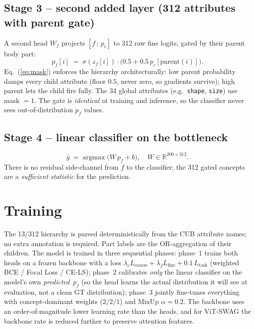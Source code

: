 \documentclass[10pt,conference,twocolumn,a4paper]{article}
\begin{document}
\subsection{Stage 3 -- second added layer (312 attributes with parent gate)}
A second head $W_f$ projects $[f \,;\, p_c]$ to 312 raw fine logits, gated
by their parent body part:
\begin{equation}
p_f[i] \;=\; \sigma(z_f[i]) \cdot \bigl(0.5 + 0.5\,p_c[\mathrm{parent}(i)]\bigr).
\label{eq:mask}
\end{equation}
Eq.~(\ref{eq:mask}) enforces the hierarchy architecturally: low parent
probability damps every child attribute (floor $0.5$, never zero, so
gradients survive); high parent lets the child fire fully. The 34
global attributes (e.g.\ \texttt{shape}, \texttt{size}) use mask $=1$.
The gate is \emph{identical} at training and inference, so the classifier
never sees out-of-distribution $p_f$ values.

\subsection{Stage 4 -- linear classifier on the bottleneck}
\[
\hat y \;=\; \mathrm{argmax}\;\bigl(W\,p_f + b\bigr),
\quad W \in \mathbb{R}^{200\times 312}.
\]
There is no residual side-channel from $f$ to the classifier; the 312
gated concepts are a \emph{sufficient statistic} for the prediction.

\section{Training}\label{sec:train}
The 13/312 hierarchy is parsed deterministically from the CUB attribute
names; no extra annotation is required. Part labels are the OR-aggregation
of their children. The model is trained in three sequential phases:
phase~1 trains both heads on a frozen backbone with a loss
$\lambda_c L_{\text{coarse}} + \lambda_f L_{\text{fine}} +
0.1\,L_{\text{task}}$ (weighted BCE / Focal Loss / CE-LS); phase~2
calibrates \emph{only} the linear classifier on the model's own
\emph{predicted}~$p_f$ (so the head learns the actual distribution it will
see at evaluation, not a clean GT distribution); phase~3 jointly
fine-tunes everything with concept-dominant weights ($2/2/1$) and MixUp
$\alpha{=}0.2$. The backbone uses an order-of-magnitude lower learning
rate than the heads, and for ViT-SWAG the backbone rate is reduced
further to preserve attention features.
\end{document}
